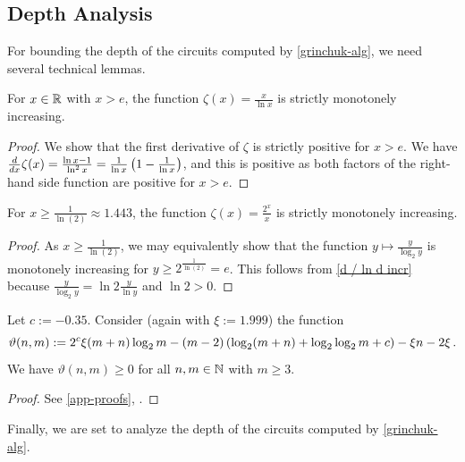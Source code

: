 \subsection{Depth Analysis} \label{sec-grinchuk-depth}

For bounding the depth of the circuits computed by \cref{grinchuk-alg},
we need several technical lemmas.

\begin{lemma} \label{d / ln d incr}
 For $x \in \mathbb R$ with $x > e$, the function $\zeta(x) = \frac{x}{\ln x}$ is strictly monotonely increasing.
 \begin{proof}
  We show that the first derivative of $\zeta$ is strictly positive for $x > e$.
  We have
  $\frac{d}{dx} \zeta(x) = \frac{\ln x - 1}{\ln^2 x} = \frac{1}{\ln x} \left({ 1 - \frac{1}{\ln x}}\right)$,
  and this is positive as both factors of the right-hand side function are positive for $x > e$.
 \end{proof}
\end{lemma}

\begin{lemma} \label{d / log d incr}
 For $x \geq \frac{1}{\ln (2)} \approx 1.443$, the function $\zeta(x) = \frac{2^x}{x}$ 
 is strictly monotonely increasing.
 \begin{proof}
  As $x \geq \frac{1}{\ln (2)}$, we may equivalently show that the function $y \mapsto \frac{y}{\log_2 y}$
  is monotonely increasing for $y \geq 2^{\frac{1}{\ln (2)}} = e$.
  This follows from \cref{d / ln d incr} because ${\frac{y}{\log_2 y} = \ln 2 \frac{y}{\ln y}}$
  and $\ln 2 > 0$.
 \end{proof}
\end{lemma}

\begin{lemma} \label{lem-theta-0-m}
Let $c := -0.35$.
Consider (again with $\xi:=1.999$) the function
\[\vartheta(n, m) := 2^{c} \xi (m + n) \log_2 m - (m-2) \left({\log_2(m + n) + \log_2 \log_2 m + c}\right) - \xi n - 2\xi\,.\]
We have $\vartheta(n, m) \geq 0$ for all $n, m \in \mathbb N$ with $m \geq 3$.
\begin{proof}
 See \cref{app-proofs}, .
\end{proof}
\end{lemma}

Finally, we are set to analyze the depth of the circuits computed by \cref{grinchuk-alg}.

